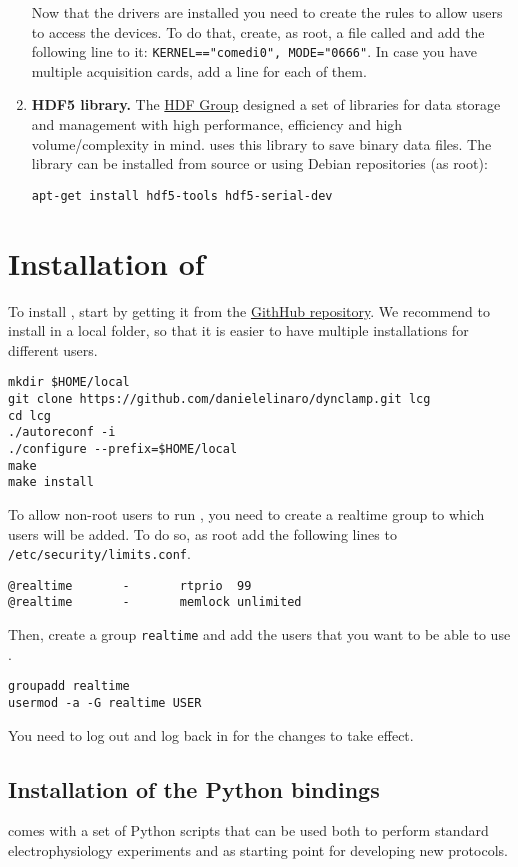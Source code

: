 \begin{enumerate}
Now that the drivers are installed you need to create the rules to
allow users to access the devices. To do that, create, as root, a file
called  and add the
following line to it: \texttt{KERNEL=="comedi0", MODE="0666"}. In case
you have multiple acquisition cards, add a line for each of them.
\item \textbf{HDF5 library.}
The \href{http://www.hdfgroup.org/HDF5/}{HDF Group} designed a set of
libraries for data storage and management with high performance,
efficiency and high volume/complexity in mind. \textbf{\progname} uses
this library to save binary data files. The
library can be installed from source or using Debian repositories
(as root):
\begin{lstlisting}
apt-get install hdf5-tools hdf5-serial-dev
\end{lstlisting}
\end{enumerate}

\section{Installation of \progname}
\label{install:program}
To install \progname, start by getting it from the
\href{https://github.com/danielelinaro/dynclamp}{GithHub
  repository}. We recommend to install \progname in a local folder, so
that it is easier to have multiple installations for different users.
\begin{lstlisting}
mkdir $HOME/local
git clone https://github.com/danielelinaro/dynclamp.git lcg
cd lcg
./autoreconf -i
./configure --prefix=$HOME/local
make
make install
\end{lstlisting}

To allow non-root users to run \progname, you need to create a
realtime group to which users will be added. To do so, as root add
the following lines to \texttt{/etc/security/limits.conf}.
\begin{lstlisting}
@realtime       -       rtprio  99
@realtime       -       memlock unlimited
\end{lstlisting}
Then, create a group \texttt{realtime} and add the users that you want
to be able to use \progname.
\begin{lstlisting}
groupadd realtime
usermod -a -G realtime USER
\end{lstlisting}
You need to log out and log back in for the changes to take effect.

\subsection{Installation of the Python bindings}
\progname comes with a set of Python scripts that can be used both to
perform standard electrophysiology experiments and as starting point
for developing new protocols.

